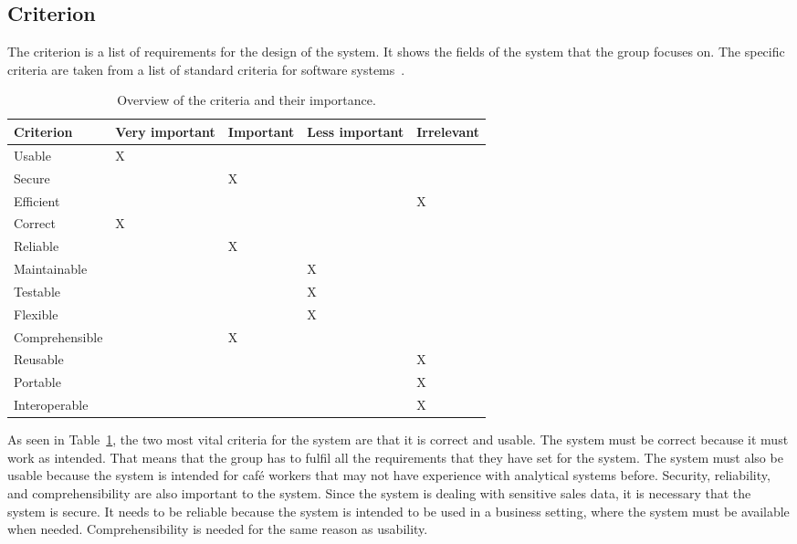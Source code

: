 \subsection{Criterion}\label{subsec:criterion}

The criterion is a list of requirements for the design of the system.
It shows the fields of the system that the group focuses on.
The specific criteria are taken from a list of standard criteria for software systems~\cite[180]{mathiassen2018}.

\begin{table}[H]
    \begin{tabularx}{\textwidth}{ l X X X X }
        \toprule
        \textbf{Criterion}
        & \textbf{Very important}
        & \textbf{Important}
        & \textbf{Less important}
        & \textbf{Irrelevant}
        \\ \midrule
        Usable
        & X
        \\ \midrule
        Secure
        & & X
        \\ \midrule
        Efficient
        & & & & X
        \\ \midrule
        Correct
        & X
        \\ \midrule
        Reliable
        & & X
        \\ \midrule
        Maintainable
        & & & X
        \\ \midrule
        Testable
        & & & X
        \\ \midrule
        Flexible
        & & & X
        \\ \midrule
        Comprehensible
        & & X
        \\ \midrule
        Reusable
        & & & & X
        \\ \midrule
        Portable
        & & & & X
        \\ \midrule
        Interoperable
        & & & & X
        \\ \bottomrule
    \end{tabularx}
    \caption{Overview of the criteria and their importance.
    }\label{tab:criterion}
\end{table}

As seen in Table~\ref{tab:criterion}, the two most vital criteria for the system are that it is correct and usable.
The system must be correct because it must work as intended.
That means that the group has to fulfil all the requirements that they have set for the system.
The system must also be usable because the system is intended for café workers that may not have experience with
analytical systems before.
Security, reliability, and comprehensibility are also important to the system.
Since the system is dealing with sensitive sales data, it is necessary that the system is secure.
It needs to be reliable because the system is intended to be used in a business setting, where the system must be
available when needed.
Comprehensibility is needed for the same reason as usability.


